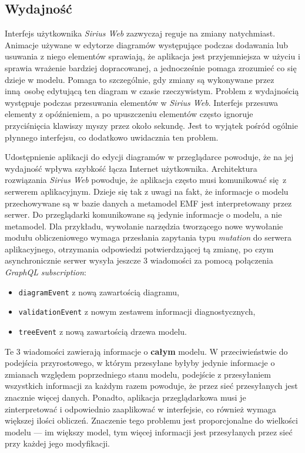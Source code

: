 \subsection{Wydajność}

Interfejs użytkownika \emph{Sirius Web} zazwyczaj reguje na zmiany natychmiast.
Animacje używane w edytorze diagramów występujące podczas dodawania lub
usuwania z niego elementów sprawiają, że aplikacja jest przyjemniejsza w użyciu
i sprawia wrażenie bardziej dopracowanej, a jednocześnie pomaga zrozumieć co
się dzieje w modelu. Pomaga to szczególnie, gdy zmiany są wykonywane przez
inną osobę edytującą ten diagram w czasie rzeczywistym.
Problem z wydajnością występuje podczas przesuwania elementów w \emph{Sirius
	Web}. Interfejs przesuwa elementy z opóźnieniem, a po upuszczeniu
elementów
często ignoruje przyciśnięcia klawiszy myszy przez około sekundę. Jest to
wyjątek pośród ogólnie płynnego interfejsu, co dodatkowo uwidacznia ten
problem.

Udostępnienie aplikacji do edycji diagramów w przeglądarce powoduje, że na
jej wydajność wpływa szybkość łącza Internet użytkownika. Architektura
rozwiązania \emph{Sirius Web} powoduje, że aplikacja często musi komunikować
się z serwerem aplikacyjnym. Dzieje się tak z uwagi na fakt, że informacje o
modelu przechowywane są w bazie danych a metamodel \gls{EMF} jest
interpretowany przez serwer. Do przeglądarki komunikowane są jedynie informacje
o modelu, a nie metamodel. Dla przykładu, wywołanie narzędzia tworzącego nowe
wywołanie modułu obliczeniowego wymaga przesłania zapytania typu
\emph{mutation} do serwera aplikacyjnego, otrzymania odpowiedzi potwierdzającej
tą zmianę, po czym asynchronicznie serwer wysyła jeszcze 3 wiadomości
za pomocą połączenia \emph{GraphQL} \emph{subscription}:

\begin{itemize}
	\item \texttt{diagramEvent} z nową zawartością diagramu,
	\item \texttt{validationEvent} z nowym zestawem informacji
	      diagnostycznych,
	\item \texttt{treeEvent} z nową zawartością drzewa modelu.
\end{itemize}

Te 3 wiadomości zawierają informacje o \textbf{całym} modelu. W przeciwieństwie
do podejścia przyrostowego, w którym przesyłane byłyby jedynie informacje o
zmianach względem poprzedniego stanu modelu, podejście z przesyłaniem
wszystkich informacji za każdym razem powoduje, że przez sieć przesyłanych jest
znacznie więcej danych. Ponadto, aplikacja przeglądarkowa musi je
zinterpretować i odpowiednio zaaplikować w interfejsie, co również wymaga
większej ilości obliczeń. Znaczenie tego problemu jest proporcjonalne do
wielkości modelu --- im większy model, tym więcej informacji jest przesyłanych
przez sieć przy każdej jego modyfikacji.

